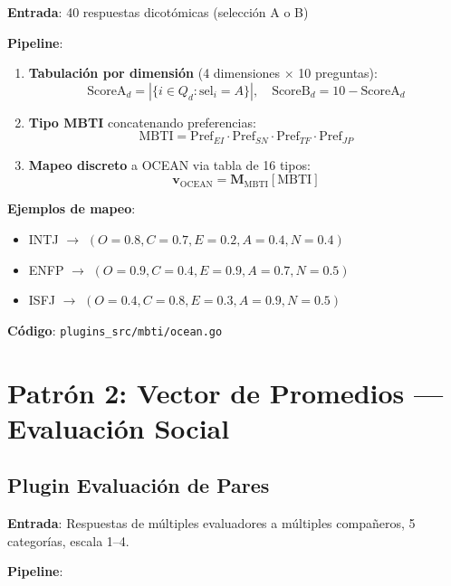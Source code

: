 \documentclass[12pt,a4paper]{article}
\begin{document}
\textbf{Entrada}: 40 respuestas dicotómicas (selección A o B)

\textbf{Pipeline}:

\begin{enumerate}
    \item \textbf{Tabulación por dimensión} (4 dimensiones $\times$ 10 preguntas):
    \[
    \text{ScoreA}_d = |\{i \in Q_d : \text{sel}_i = A\}|, \quad \text{ScoreB}_d = 10 - \text{ScoreA}_d
    \]
    
    \item \textbf{Tipo MBTI} concatenando preferencias:
    \[
    \text{MBTI} = \text{Pref}_{EI} \cdot \text{Pref}_{SN} \cdot \text{Pref}_{TF} \cdot \text{Pref}_{JP}
    \]
    
    \item \textbf{Mapeo discreto} a OCEAN via tabla de 16 tipos:
    \[
    \mathbf{v}_{\text{OCEAN}} = \mathbf{M}_{\text{MBTI}}[\text{MBTI}]
    \]
\end{enumerate}

\textbf{Ejemplos de mapeo}:
\begin{itemize}
    \item INTJ $\to$ $(O=0.8, C=0.7, E=0.2, A=0.4, N=0.4)$
    \item ENFP $\to$ $(O=0.9, C=0.4, E=0.9, A=0.7, N=0.5)$
    \item ISFJ $\to$ $(O=0.4, C=0.8, E=0.3, A=0.9, N=0.5)$
\end{itemize}

\textbf{Código}: \texttt{plugins\_src/mbti/ocean.go}

\section{Patrón 2: Vector de Promedios --- Evaluación Social}
\label{sec:average}

\subsection{Plugin Evaluación de Pares}

\textbf{Entrada}: Respuestas de múltiples evaluadores a múltiples compañeros, 5 categorías, escala 1--4.

\textbf{Pipeline}:
\end{document}
